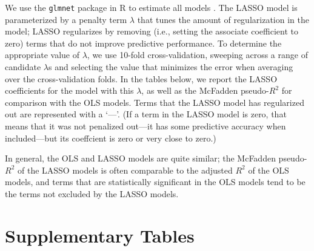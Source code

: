 \documentclass[10pt,landscape]{article}
\begin{document}
We use the \texttt{glmnet} package in R to estimate all models \parencite{simon_regularization_2011}. 
The LASSO model is parameterized by a penalty term \(\lambda\) that tunes the amount of regularization in the model; LASSO regularizes by removing (i.e., setting the associate coefficient to zero) terms that do not improve predictive performance.
To determine the appropriate value of \(\lambda\), we use 10-fold cross-validation, sweeping across a range of candidate \(\lambda\)s and selecting the value that minimizes the error when averaging over the cross-validation folds.
In the tables below, we report the LASSO coefficients for the model with this \(\lambda\), as well as the McFadden pseudo-\(R^2\) for comparison with the OLS models.
Terms that the LASSO model has regularized out are represented with a `---'. 
(If a term in the LASSO model is zero, that means that it was not penalized out---it has some predictive accuracy when included---but its coeffcient is zero or very close to zero.)

In general, the OLS and LASSO models are quite similar; the McFadden pseudo-\(R^2\) of the LASSO models is often comparable to the adjusted \(R^2\) of the OLS models, and terms that are statistically significant in the OLS models tend to be the terms not excluded by the LASSO models. 
\clearpage


\section{Supplementary Tables}


\clearpage


\clearpage


\clearpage


\clearpage


\clearpage


\clearpage


\clearpage


\clearpage


\clearpage


\clearpage


\clearpage


\clearpage
\end{document}
